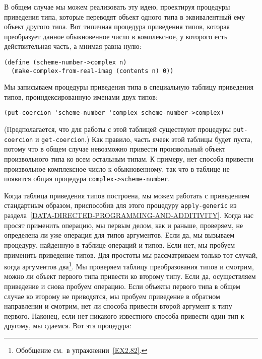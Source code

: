 В общем случае мы можем реализовать эту идею,
проектируя процедуры приведения типа, которые переводят объект одного
типа в эквивалентный ему объект другого типа.  Вот типичная процедура
приведения типов, которая преобразует данное обыкновенное число в
комплексное, у которого есть действительная часть, а мнимая равна
нулю:

\begin{Verbatim}[fontsize=\small]
(define (scheme-number->complex n)
  (make-complex-from-real-imag (contents n) 0))
\end{Verbatim}
Мы записываем процедуры приведения типа в
специальную таблицу 
приведения типов, проиндексированную именами двух типов:

\begin{Verbatim}[fontsize=\small]
(put-coercion 'scheme-number 'complex scheme-number->complex)
\end{Verbatim}
(Предполагается, что для работы с этой таблицей существуют процедуры
{\tt put-coercion} и {\tt get-coercion}.)  Как правило,
часть ячеек этой таблицы будет пуста, потому что в общем случае
невозможно привести произвольный объект произвольного типа ко всем
остальным типам.  К примеру, нет способа привести произвольное
комплексное число к обыкновенному, так что в таблице не появится общая
процедура {\tt complex->scheme-number}.

Когда таблица приведения типов построена, мы можем
работать с приведением стандартным образом, приспособив для этого процедуру
{\tt apply-generic} из 
раздела~\ref{DATA-DIRECTED-PROGRAMMING-AND-ADDITIVITY}.  Когда нас
просят применить операцию, мы первым делом, как и раньше, проверяем, не определена ли
уже операция для типов аргументов.  Если да, мы вызываем процедуру,
найденную в таблице операций и типов.  Если нет, мы пробуем применить
приведение типов.  Для простоты мы рассматриваем только тот случай,
когда аргументов два\footnote{Обобщение см.~в упражнении~\ref{EX2.82}.}.
Мы проверяем таблицу преобразования типов и смотрим, можно ли объект
первого типа привести ко второму типу.  Если да, осуществляем
приведение и снова пробуем операцию.  Если объекты первого типа в
общем случае ко второму не приводятся, мы пробуем приведение в
обратном направлении и смотрим, нет ли способа привести второй аргумент
к типу первого.  Наконец, если нет никакого известного способа
привести один тип к другому, мы сдаемся.  Вот эта процедура:

